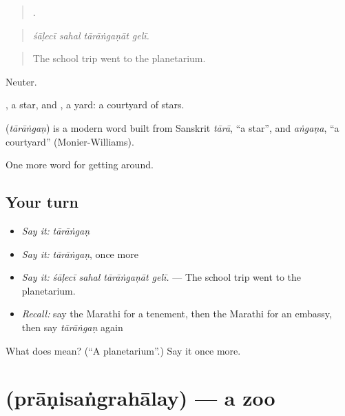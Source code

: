 \begin{quote}
   .
\end{quote}

\begin{quote}
\emph{śāḷecī sahal tārāṅgaṇāt gelī.}
\end{quote}

\begin{quote}
The school trip went to the planetarium.
\end{quote}

Neuter.

, a star, and , a yard: a courtyard of stars.

\begin{cousinweb}
\textbf{} (\emph{tārāṅgaṇ}) is a modern word built from Sanskrit \emph{tārā}, \textquotedblleft{}a star\textquotedblright{}, and \emph{aṅgaṇa}, \textquotedblleft{}a courtyard\textquotedblright{} (Monier-Williams).
\end{cousinweb}

\begin{grammarlens}[title={What you've built}]
One more word for getting around.
\end{grammarlens}

\subsection*{Your turn}
\begin{itemize}
\raggedright
  \item \emph{Say it:} \emph{tārāṅgaṇ}
  \item \emph{Say it:} \emph{tārāṅgaṇ}, once more
  \item \emph{Say it:} \emph{śāḷecī sahal tārāṅgaṇāt gelī.} — The school trip went to the planetarium.
  \item \emph{Recall:} say the Marathi for a tenement, then the Marathi for an embassy, then say \emph{tārāṅgaṇ} again
\end{itemize}

\begin{tcolorbox}[breakable,colback=teal!4,colframe=teal!35!black,title={Before you move on}]
What does  mean? (\textquotedblleft{}A planetarium\textquotedblright{}.) Say it once more.
\end{tcolorbox}
\section[\texorpdfstring{\mr{प्राणिसंग्रहालय} (prāṇisaṅgrahālay)}{प्राणिसंग्रहालय (prāṇisaṅgrahālay)}]{ (prāṇisaṅgrahālay) — a zoo}

